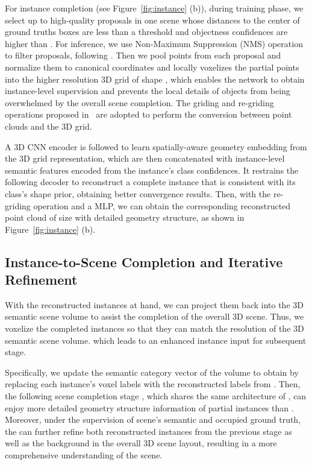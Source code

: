 \documentclass[final]{cvpr}
\begin{document}
For instance completion (see Figure~\ref{fig:instance} (b)), during training phase, we select up to  high-quality proposals in one scene whose distances to the center of ground truths boxes are less than a threshold  and objectness confidences are higher than . For inference, we use Non-Maximum Suppression (NMS) operation to filter proposals, following \cite{qi2019deep}. Then we pool  points from each proposal and normalize them to canonical coordinates and locally voxelizes the partial points into the higher resolution 3D grid of shape , which enables the network to obtain instance-level supervision and prevents the local details of objects from being overwhelmed by the overall scene completion.
The griding and re-griding operations proposed in~\cite{xie2020grnet} are adopted to perform the conversion between point clouds and the 3D grid.

A 3D CNN encoder is followed to learn spatially-aware geometry embedding  from the 3D grid representation, which are then concatenated with instance-level semantic features  encoded from the instance's class confidences. It restrains the following decoder to reconstruct a complete instance that is consistent with its class's shape prior, obtaining better convergence results.
Then, with the re-griding operation and a MLP, we can obtain the corresponding reconstructed point cloud of size  with detailed geometry structure, as shown in Figure~\ref{fig:instance} (b).
\vspace{-0.1cm}
\subsection{Instance-to-Scene Completion and Iterative Refinement}
\vspace{-0.1cm}
With the reconstructed instances at hand, we can project them back into the 3D semantic scene volume to assist the completion of the overall 3D scene. Thus, we voxelize the completed instances so that they can match the resolution of the 3D semantic scene volume. 
which leads to an enhanced instance input for subsequent stage. 

Specifically, we update the semantic category vector of the  volume to obtain  by replacing each instance's voxel labels with the reconstructed labels from . Then, the following scene completion stage , which shares the same architecture of , can enjoy more detailed geometry structure information of partial instances than . Moreover, under the supervision of scene's semantic and occupied ground truth, the  can further refine both reconstructed instances from the previous  stage as well as the background in the overall 3D scene layout, resulting in a more comprehensive understanding of the scene.
\end{document}
